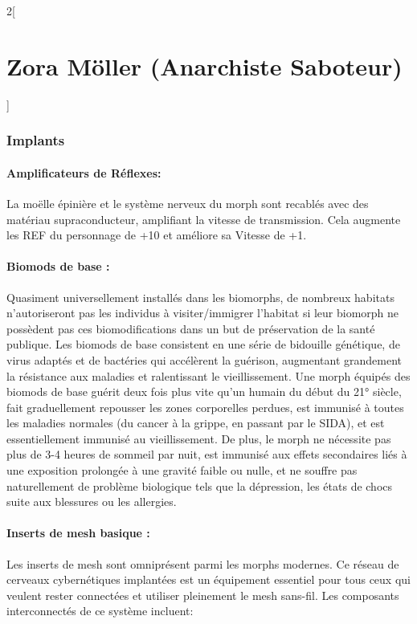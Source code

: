 \documentclass[a4paper,9pt]{article}
\begin{document}
\begin{multicols}{2}[\section*{Zora Möller (Anarchiste Saboteur)}]
\subsubsection*{Implants}

\paragraph{Amplificateurs de Réflexes:} La moëlle épinière et le système nerveux
du morph sont recablés avec des matériau supraconducteur, amplifiant la
vitesse de transmission. Cela augmente les REF du personnage de +10 et améliore
sa Vitesse de +1.

\paragraph{Biomods de base :} 
Quasiment universellement  installés dans les biomorphs, de nombreux habitats
n'autoriseront pas les individus à visiter/immigrer l'habitat si leur biomorph
ne possèdent pas ces biomodifications dans un but de préservation de la santé
publique. Les biomods de base consistent en une série de bidouille génétique,
de virus adaptés et de bactéries qui accélèrent la guérison, augmentant
grandement la résistance aux maladies et ralentissant le vieillissement. Une
morph équipés des biomods de base guérit deux fois plus vite qu'un humain du
début du 21° siècle, fait graduellement repousser les zones corporelles
perdues, est immunisé à toutes les maladies normales (du cancer à la grippe, en
passant par le SIDA), et est essentiellement immunisé au vieillissement. De
plus, le morph ne nécessite pas plus de 3-4 heures de sommeil par nuit, est
immunisé aux effets secondaires liés à une exposition prolongée à une gravité
faible ou nulle, et ne souffre pas naturellement de problème biologique tels
que la dépression, les états de chocs suite aux blessures ou les allergies.

\paragraph{Inserts de mesh basique :} 
Les inserts de mesh sont omniprésent parmi les morphs modernes. Ce réseau de
cerveaux cybernétiques implantées est un équipement essentiel pour tous ceux
qui veulent rester connectées et utiliser pleinement le mesh sans-fil. Les
composants interconnectés de ce système incluent: 


\end{multicols}
\end{document}
